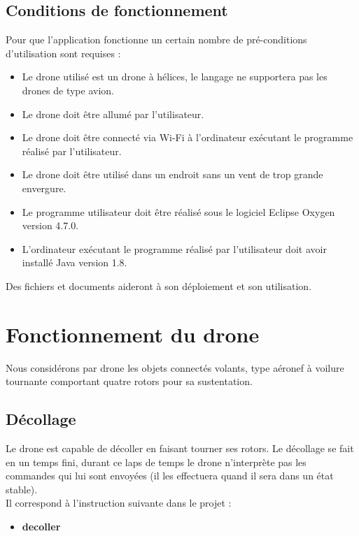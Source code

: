 \documentclass[12pt, openany]{report}
\begin{document}
\section{Conditions de fonctionnement}

Pour que l'application fonctionne un certain nombre de pré-conditions d'utilisation sont requises :
\begin{itemize}
	  \item Le drone utilisé est un drone à hélices, le langage ne supportera pas les drones de type avion.
      \item Le drone doit être allumé par l'utilisateur.
      \item Le drone doit être connecté via Wi-Fi à l'ordinateur exécutant le programme réalisé par l'utilisateur.
      \item Le drone doit être utilisé dans un endroit sans un vent de trop grande envergure.
      \item Le programme utilisateur doit être réalisé sous le logiciel Eclipse Oxygen version 4.7.0.
      \item L'ordinateur exécutant le programme réalisé par l'utilisateur doit avoir installé Java version 1.8.
\end{itemize}
           
\vspace{10px}           
Des fichiers et documents aideront à son déploiement et son utilisation. 


\chapter{Fonctionnement du drone}
Nous considérons par drone les objets connectés volants, type aéronef à voilure tournante comportant quatre rotors pour sa sustentation.

\section{Décollage}
Le drone est capable de décoller en faisant tourner ses rotors. Le décollage se fait en un temps fini, durant ce laps de temps le drone n'interprète pas les commandes qui lui sont envoyées (il les effectuera quand il sera dans un état stable). \\
Il correspond à l'instruction suivante dans le projet :
\begin{itemize}
     \item \textbf{decoller}
\end{itemize}
        
\end{document}
